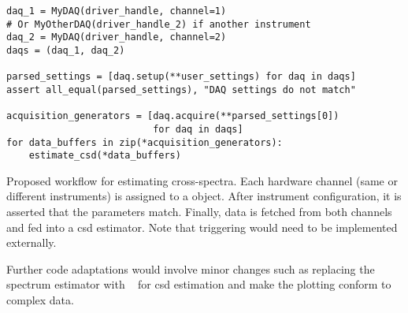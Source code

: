 \begin{listing}[htpb]
    \begin{verbatim}
daq_1 = MyDAQ(driver_handle, channel=1)
# Or MyOtherDAQ(driver_handle_2) if another instrument
daq_2 = MyDAQ(driver_handle, channel=2)
daqs = (daq_1, daq_2)

parsed_settings = [daq.setup(**user_settings) for daq in daqs]
assert all_equal(parsed_settings), "DAQ settings do not match"

acquisition_generators = [daq.acquire(**parsed_settings[0])
                          for daq in daqs]
for data_buffers in zip(*acquisition_generators):
    estimate_csd(*data_buffers)
    \end{verbatim}
    \caption[Proposed  workflow for cross-spectra]{
        Proposed  workflow for estimating cross-spectra.
        Each hardware channel (same or different instruments) is assigned to a  object.
        After instrument configuration, it is asserted that the parameters match.
        Finally, data is fetched from both channels and fed into a \gls{csd} estimator.
        Note that triggering would need to be implemented externally.
    }
    \label{lst:speck:conclusion:cross_workflow}
\end{listing}

Further code adaptations would involve minor changes such as replacing the spectrum estimator with ~ for \gls{csd} estimation
and make the plotting conform to complex data.
